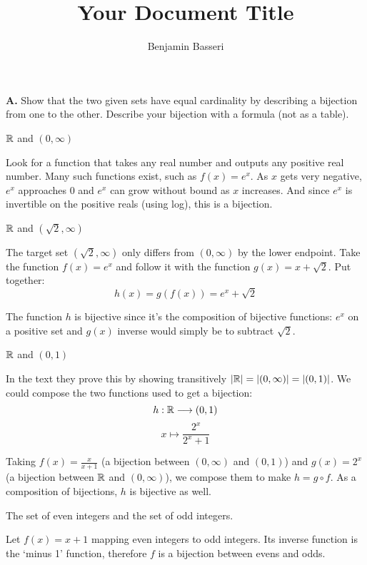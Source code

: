 \documentclass{article}
\title{Your Document Title}
\author{Benjamin Basseri}
\begin{document}
\maketitle

\textbf{A.} Show that the two given sets have equal cardinality by describing a bijection from one to the other. Describe your bijection with a formula (not as a table).

\begin{problem}
$\mathbb{R}$ and $(0, \infty)$
\end{problem}

Look for a function that takes any real number and outputs any positive real number. Many such functions exist, such as $f(x) = e^x$. As $x$ gets very negative, $e^x$ approaches 0 and $e^x$ can grow without bound as $x$ increases. And since $e^x$ is invertible on the positive reals (using log), this is a bijection.

\begin{problem}
$\mathbb{R}$ and $(\sqrt{2}, \infty)$
\end{problem}

The target set $(\sqrt{2}, \infty)$ only differs from $(0, \infty)$ by the lower endpoint. Take the function $f(x) = e^x$ and follow it with the function $g(x) = x + \sqrt{2}$. Put together:
$$h(x) = g(f(x)) = e^x + \sqrt{2}$$

The function $h$ is bijective since it's the composition of bijective functions: $e^x$ on a positive set and $g(x)$ inverse would simply be to subtract $\sqrt{2}$.

\begin{problem}
$\mathbb{R}$ and $(0, 1)$
\end{problem}

In the text they prove this by showing transitively $|\mathbb{R}| = |(0, \infty)| = |(0, 1)|$. We could compose the two functions used to get a bijection:
$$h: \mathbb{R} \longrightarrow (0, 1)$$
$$x \longmapsto \frac{2^x}{2^x + 1}$$

Taking $f(x) = \frac{x}{x + 1}$ (a bijection between $(0, \infty)$ and $(0, 1)$) and $g(x) = 2^x$ (a bijection between $\mathbb{R}$ and $(0, \infty)$), we compose them to make $h = g \circ f$. As a composition of bijections, $h$ is bijective as well.

\begin{problem}
The set of even integers and the set of odd integers.
\end{problem}

Let $f(x) = x + 1$ mapping even integers to odd integers. Its inverse function is the `minus 1' function, therefore $f$ is a bijection between evens and odds.
\end{document}
